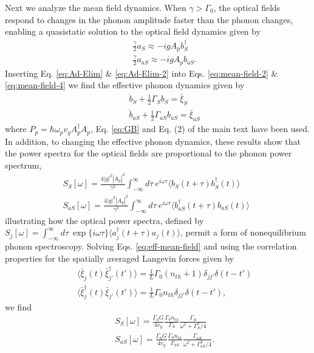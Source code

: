 Next we analyze the mean field dynamics. When $\gamma > \Gamma_0$, the optical fields respond to changes in the phonon amplitude faster than the phonon changes, enabling a quasistatic solution to the optical field dynamics given by
\begin{eqnarray}
\label{eq:Ad-Elim}
   &&  \frac{\gamma}{2}a_S \approx -i g A_p b_S^\dag \\
   \label{eq:Ad-Elim-2}
   &&  \frac{\gamma}{2} a_{aS} \approx -i g A_p b_{aS}.
\end{eqnarray}
Inserting Eq. \eqref{eq:Ad-Elim} \& \eqref{eq:Ad-Elim-2} into Eqs. \eqref{eq:mean-field-2} \& \eqref{eq:mean-field-4} we find the effective phonon dynamics given by
\begin{eqnarray}
\label{eq:eff-mean-field}
   && \dot{b}_S + \frac{1}{2} \Gamma_S b_S  =  \bar{\xi}_S \\
   \label{eq:eff-mean-field-2}
   && \dot{b}_{aS} + \frac{1}{2}\Gamma_{aS} b_{aS}  =  \bar{\xi}_{aS}
\end{eqnarray}
where $P_p = \hbar \omega_p v_g A^\dag_p A_p$, Eq. \eqref{eq:GB} and Eq. (2) of the main text have been used. In addition, to changing the effective phonon dynamics, these results show that the power spectra for the optical fields are proportional to the phonon power spectrum,
\begin{eqnarray}
   && \!\!\!\!\!\!\!\!\!\!S_S[\omega] = \frac{4|g|^2 |A_p|^2}{\gamma^2} \!\int_{-\infty}^{\infty} d\tau \ e^{i\omega \tau} \langle b_S(t+\tau) b_S^\dag(t)\rangle
    \\
   && \!\!\!\!\!\!\!\!\!\! S_{aS}[\omega] = \frac{4|g|^2 |A_p|^2}{\gamma^2} \!\int_{-\infty}^{\infty} d\tau \ e^{i\omega \tau} \langle b^\dag_{aS}(t\!+\!\tau) b_{aS}(t)\rangle \quad \quad
\end{eqnarray}
illustrating how the optical power spectra, defined by
$S_j[\omega] = \int_{-\infty}^{\infty} d\tau \ \exp\{i\omega\tau\} \langle a^\dag_{j}(t+\tau) a_{j}(t)\rangle$, permit a form of nonequilibrium phonon spectroscopy. Solving Eqs. \eqref{eq:eff-mean-field} and using the correlation properties for the spatially averaged Langevin forces given by
\begin{eqnarray}
  &&  \langle \bar{\xi}_j(t) \bar{\xi}_{j'}^\dag(t')\rangle = \frac{1}{L}\Gamma_0 (n_{th}+1) \delta_{jj'} \delta(t-t') \\
  && \langle \bar{\xi}_j^\dag(t) \bar{\xi}_{j'}(t')\rangle = \frac{1}{L}\Gamma_0 n_{th} \delta_{jj'} \delta(t-t'),
\end{eqnarray}
we find
\begin{eqnarray}
   && S_S[\omega] = \frac{\Gamma_0 G}{4  v_g} \frac{\Gamma_0 n_{th}}{\Gamma_S} \frac{\Gamma_S}{\omega^2 + \Gamma_S^2/4}
    \\
   && S_{aS}[\omega] = \frac{\Gamma_0 G }{4 v_g} \frac{\Gamma_0 n_{th}}{\Gamma_{aS}} \frac{\Gamma_{aS}}{\omega^2 + \Gamma_{aS}^2/4}.
\end{eqnarray}
